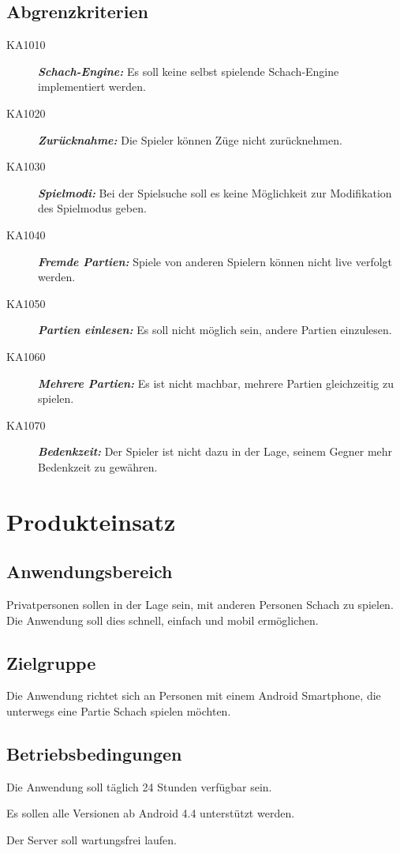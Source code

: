 \documentclass[parskip=full]{scrartcl}
\begin{document}
\subsection{Abgrenzkriterien}
\begin{description}
\item[KA1010] \textbf{\textit{\gls{Schach-Engine}:}} Es soll keine selbst spielende \gls{Schach-Engine} implementiert werden.
\item[KA1020] \textbf{\textit{Zurücknahme:}} Die Spieler können Züge nicht zurücknehmen.
\item[KA1030] \textbf{\textit{Spielmodi:}} Bei der Spielsuche soll es keine Möglichkeit zur Modifikation des Spielmodus geben.
\item[KA1040] \textbf{\textit{Fremde Partien:}} Spiele von anderen \gls{Spieler}n können nicht live verfolgt werden.
\item[KA1050] \textbf{\textit{Partien einlesen:}} Es soll nicht möglich sein, andere Partien einzulesen.
\item[KA1060] \textbf{\textit{Mehrere Partien:}} Es ist nicht machbar, mehrere Partien gleichzeitig zu spielen.
\item[KA1070] \textbf{\textit{\gls{Bedenkzeit}:}} Der Spieler ist nicht dazu in der Lage, seinem Gegner mehr \gls{Bedenkzeit} zu gewähren.
\end{description}
\newpage
\section{Produkteinsatz}
	\subsection{Anwendungsbereich}
		
			Privatpersonen sollen in der Lage sein, mit anderen Personen \gls{Schach} zu spielen. Die Anwendung soll dies schnell, einfach und mobil ermöglichen.	
		
	\subsection{Zielgruppe}
		
			Die Anwendung richtet sich an Personen mit einem Android \gls{Smartphone}, die unterwegs eine Partie \gls{Schach} spielen möchten.
		
	\subsection{Betriebsbedingungen}
		\begin{description}
			\item Die Anwendung soll täglich 24 Stunden verfügbar sein.
			\item Es sollen alle Versionen ab Android 4.4 unterstützt werden.
			\item Der Server soll wartungsfrei laufen.	
		\end{description}
	\newpage
\end{document}
